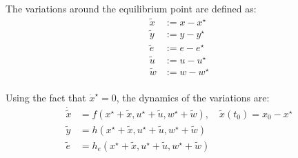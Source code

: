 \documentclass[]{report}
\begin{document}
The variations around the equilibrium point are defined as:
\begin{equation}
	\label{eq:variations}
	\begin{aligned}
		\tilde{x} &:= x - x^\star \\
		\tilde{y} &:= y - y^\star \\
		\tilde{e} &:= e - e^\star \\
		\tilde{u} &:= u - u^\star \\
		\tilde{w} &:= w - w^\star \\
	\end{aligned}
\end{equation}

Using the fact that \(\dot{x}^\star = 0\), the dynamics of the variations are:
\begin{equation}
	\label{eq:variation_dynamics}
	\begin{aligned}
		\dot{\tilde{x}} &= f(x^\star + \tilde{x}, u^\star + \tilde{u}, w^\star + \tilde{w}), \quad \tilde{x}(t_0) = x_0 - x^\star \\
		\tilde{y} &= h(x^\star + \tilde{x}, u^\star + \tilde{u}, w^\star + \tilde{w}) \\
		\tilde{e} &= h_e(x^\star + \tilde{x}, u^\star + \tilde{u}, w^\star + \tilde{w})
	\end{aligned}
\end{equation}
\end{document}
